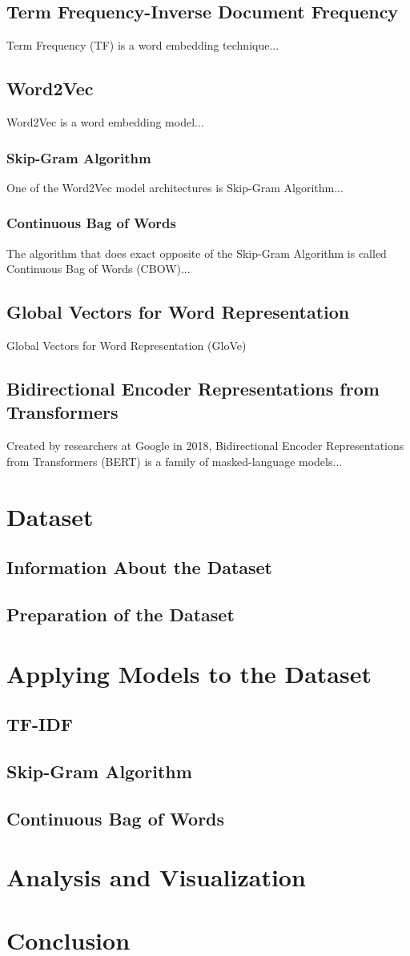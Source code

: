 \documentclass[man]{apa7}
\begin{document}
\subsection{Term Frequency-Inverse Document Frequency}
Term Frequency (TF) is a word embedding technique...
\subsection{Word2Vec}
Word2Vec is a word embedding model...
\subsubsection{Skip-Gram Algorithm}
One of the Word2Vec model architectures is Skip-Gram Algorithm...
\subsubsection{Continuous Bag of Words}
The algorithm that does exact opposite of the Skip-Gram Algorithm is called Continuous Bag of Words (CBOW)...
\subsection{Global Vectors for Word Representation}
Global Vectors for Word Representation (GloVe)
\subsection{Bidirectional Encoder Representations from Transformers}
Created by researchers at Google in 2018, Bidirectional Encoder Representations from Transformers (BERT) is a family of masked-language models...
\section{Dataset}
\lipsum[0-1]
\subsection{Information About the Dataset}
\lipsum[0-1]
\subsection{Preparation of the Dataset}
\lipsum[0-1]
\section{Applying Models to the Dataset}
\lipsum[0-1]
\subsection{TF-IDF}
\lipsum[0-1]
\subsection{Skip-Gram Algorithm}
\lipsum[0-1]
\subsection{Continuous Bag of Words}
\lipsum[0-1]
\section{Analysis and Visualization}
\section{Conclusion}
\lipsum[0-1]
\end{document}
